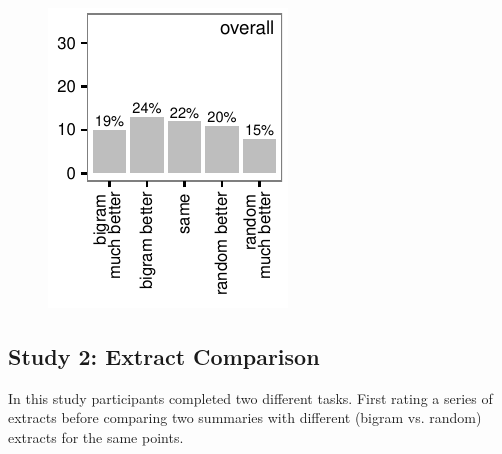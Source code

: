 \begin{figure}
\begin{minipage}{.5\textwidth}
		  \label{fig:scatter}
		\end{minipage}%
		\begin{minipage}{.25\textwidth}
		  \centering
		  \includegraphics[width=\textwidth]{graphs/bigram_vs_random_hists}
		  \label{fig:bigram_vs_random_hist}
		\end{minipage}%
	  \end{figure}

    \tocless\subsection{Study 2: Extract Comparison}
			In this study participants completed two different tasks. First rating a series of extracts before comparing two summaries with different (bigram vs. random) extracts for the same points.


